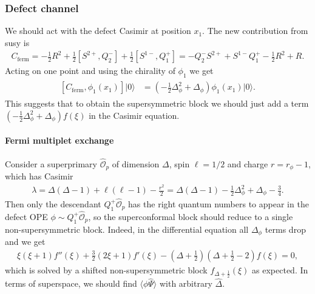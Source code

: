 \documentclass[letterpaper]{article}
\let\Oldsubsubsection\subsubsection
\renewcommand{\subsubsection}{\FloatBarrier\Oldsubsubsection}
\def\Om{{\mathcal{O}}}
\begin{document}
\subsubsection{Defect channel}

We should act with the defect Casimir at position $x_1$. 
The new contribution from susy is 
\begin{align}
 C_{\text{ferm}} =
 - \frac{1}{2} R^2 
 + \frac{1}{2} [S^{2+}, Q^-_2] 
 + \frac{1}{2} [S^{1-}, Q^+_1] 
 = - Q^-_2 S^{2+} 
   + S^{1-} Q^+_1 
   - \frac{1}{2} R^2 
   + R.
\end{align}
Acting on one point and using the chirality of $\phi_1$ we get
\begin{align}
\begin{split}
 [C_{\text{ferm}}, \phi_1(x_1) ] |0\rangle
 & = \left( -\frac{1}{2} \Delta_\phi^2 + \Delta_\phi \right) \phi_1(x_1) |0\rangle.
\end{split}
\end{align}
This suggests that to obtain the supersymmetric block we should just add a term
$( -\frac{1}{2} \Delta_\phi^2 + \Delta_\phi ) f(\xi)$ in the Casimir equation.

\paragraph{Fermi multiplet exchange}

Consider a superprimary $\hat \Om_{p}$ of dimension $\Delta$, spin $\ell = 1/2$ and charge $r = r_\phi - 1$, which has Casimir
\begin{align}
 \lambda 
 = \Delta(\Delta-1) + \ell(\ell - 1) - \frac{r^2}{2} 
 = \Delta(\Delta-1) -\frac{1}{2} \Delta_\phi^2 + \Delta_\phi - \frac{3}{4}.
\end{align}
Then only the descendant $Q^+_{1} \hat \Om_{p}$ has the right quantum numbers to appear in the defect OPE $\phi \sim Q^+_{1} \hat \Om_{p}$, so the superconformal block should reduce to a single non-supersymmetric block.
Indeed, in the differential equation all $\Delta_\phi$ terms drop and we get
\begin{align}
 \xi  (\xi +1) f''(\xi )+\frac{3}{2} (2 \xi +1) f'(\xi )
 -\left(\Delta + \frac{1}{2} \right) \left( \Delta + \frac{1}{2} - 2 \right) f(\xi ) = 0,
\end{align}
which is solved by a shifted non-supersymmetric block $f_{\Delta+\frac{1}{2}}(\xi)$ as expected.
In terms of superspace, we should find $\langle \phi \hat \Psi \rangle$ with arbitrary $\hat \Delta$.
\end{document}

